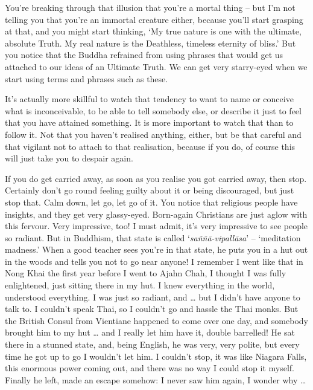 You're breaking through that illusion that you're a mortal thing -- but I'm not telling you that you're an immortal creature either, because you'll start grasping at that, and you might start thinking, `My true nature is one with the ultimate, absolute Truth. My real nature is the Deathless, timeless eternity of bliss.' But you notice that the Buddha refrained from using phrases that would get us attached to our ideas of an Ultimate Truth. We can get very starry-eyed when we start using terms and phrases such as these.

It's actually more skillful to watch that tendency to want to name or conceive what is inconceivable, to be able to tell somebody else, or describe it just to feel that you have attained something. It is more important to watch that than to follow it. Not that you haven't realised anything, either, but be that careful and that vigilant not to attach to that realisation, because if you do, of course this will just take you to despair again.

If you do get carried away, as soon as you realise you got carried away, then stop. Certainly don't go round feeling guilty about it or being discouraged, but just stop that. Calm down, let go, let go of it. You notice that religious people have insights, and they get very glassy-eyed. Born-again Christians are just aglow with this fervour. Very impressive, too! I must admit, it's very impressive to see people so radiant. But in Buddhism, that state is called `\textit{saññā-vipallāsa}' -- `meditation madness.' When a good teacher sees you're in that state, he puts you in a hut out in the woods and tells you not to go near anyone! I remember I went like that in Nong Khai the first year before I went to Ajahn Chah, I thought I was fully enlightened, just sitting there in my hut. I knew everything in the world, understood everything. I was just so radiant, and \ldots{} but I didn't have anyone to talk to. I couldn't speak Thai, so I couldn't go and hassle the Thai monks. But the British Consul from Vientiane happened to come over one day, and somebody brought him to my hut \ldots{} and I really let him have it, double barrelled! He sat there in a stunned state, and, being English, he was very, very polite, but every time he got up to go I wouldn't let him. I couldn't stop, it was like Niagara Falls, this enormous power coming out, and there was no way I could stop it myself. Finally he left, made an escape somehow: I never saw him again, I wonder why \ldots{}

